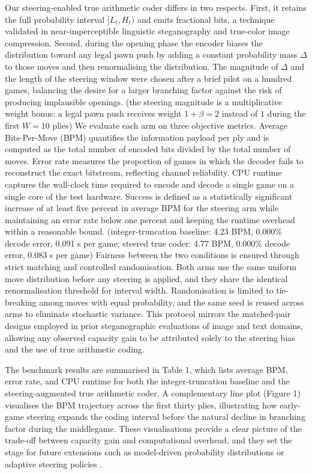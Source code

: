 \documentclass[journal]{IEEEtran}
\begin{document}
Our steering-enabled true arithmetic coder differs in two respects. First, it retains the full probability interval $[L_t, H_t)$ and emits fractional bits, a technique validated in near-imperceptible linguistic steganography and true-color image compression. Second, during the opening phase the encoder biases the distribution toward any legal pawn push by adding a constant probability mass $\Delta$ to those moves and then renormalising the distribution. The magnitude of $\Delta$ and the length of the steering window were chosen after a brief pilot on a hundred games, balancing the desire for a larger branching factor against the risk of producing implausible openings. (the steering magnitude is a multiplicative weight bonus: a legal pawn push receives weight $1+\beta = 2$ instead of $1$ during the first $W = 10$ plies) We evaluate each arm on three objective metrics. Average Bits-Per-Move (BPM) quantifies the information payload per ply and is computed as the total number of encoded bits divided by the total number of moves. Error rate measures the proportion of games in which the decoder fails to reconstruct the exact bitstream, reflecting channel reliability. CPU runtime captures the wall-clock time required to encode and decode a single game on a single core of the test hardware. Success is defined as a statistically significant increase of at least five percent in average BPM for the steering arm while maintaining an error rate below one percent and keeping the runtime overhead within a reasonable bound. (integer-truncation baseline: 4.23 BPM, 0.000\% decode error, 0.091 s per game; steered true coder: 4.77 BPM, 0.000\% decode error, 0.083 s per game) Fairness between the two conditions is ensured through strict matching and controlled randomisation. Both arms use the same uniform move distribution before any steering is applied, and they share the identical renormalisation threshold for interval width. Randomisation is limited to tie-breaking among moves with equal probability, and the same seed is reused across arms to eliminate stochastic variance. This protocol mirrors the matched-pair designs employed in prior steganographic evaluations of image and text domains, allowing any observed capacity gain to be attributed solely to the steering bias and the use of true arithmetic coding.

The benchmark results are summarised in Table 1, which lists average BPM, error rate, and CPU runtime for both the integer-truncation baseline and the steering-augmented true arithmetic coder. A complementary line plot (Figure 1) visualises the BPM trajectory across the first thirty plies, illustrating how early-game steering expands the coding interval before the natural decline in branching factor during the middlegame. These visualisations provide a clear picture of the trade-off between capacity gain and computational overhead, and they set the stage for future extensions such as model-driven probability distributions or adaptive steering policies \cite{shen2020nearimpercepti, baraskar2018truecolor, durge2026crossdataset, walker2026chessworld, nasution2018imagesteganogr, yan2026comprehensives, driss2025steganographyi, ismaiel2026taxonomydriven}.
\end{document}
